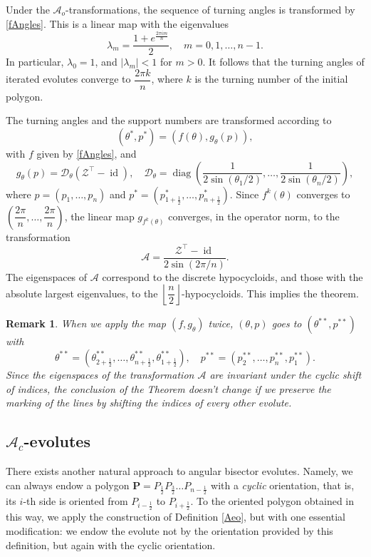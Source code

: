 \documentclass[12pt]{article}
\makeatletter
\newtheorem{remark}[lemma]{Remark}
\renewenvironment{proof}[1][\proofname] 
{\par\pushQED{\qed}\normalfont\topsep6\p@\@plus6\p@\relax\trivlist\item[\hskip\labelsep\bfseries#1\@addpunct{.}]\ignorespaces}{\popQED\endtrivlist\@endpefalse}
\newcommand{\Aev}{\mathcal{A}}
\newcommand{\Aec}{\mathcal{A}_c}
\newcommand{\Aeo}{\mathcal{A}_o}
\renewcommand{\P}{\mathbf{P}}
\newcommand{\id}{\operatorname{id}}
\newcommand{\diag}{\operatorname{diag}}
\makeatother
\begin{document}
\begin{proof}
Under the $\Aeo$-transformations, the sequence of turning angles is transformed by \eqref{fAngles}. This is a linear map with the eigenvalues
\[ \lambda_m = \frac{1+e^{\frac{2\pi i m}{n}}}2, \quad m = 0, 1, \ldots, n-1. \]
In particular, $\lambda_0 = 1$, and $|\lambda_m| < 1$ for $m > 0$. It follows that the turning angles of iterated evolutes converge to $\dfrac{2\pi k}{n}$, where $k$ is the turning number of the initial polygon. 
	
The turning angles and the support numbers are transformed according to
\[ (\theta^*, p^*) = (f(\theta), g_\theta(p)), \]
with $f$ given by \eqref{fAngles}, and
\[ g_\theta(p) = \mathcal{D}_\theta (\mathcal{Z}^\top - \id), \quad \mathcal{D}_\theta = \diag\left(\frac1{2\sin(\theta_1/2)}, \ldots, \frac1{2\sin(\theta_n/2)}\right), \]
where $p = (p_1, \ldots, p_n)$ and $p^* = (p^*_{1+\frac12}, \ldots, p^*_{n+\frac12})$. Since $f^k(\theta)$ converges to $\left( \dfrac{2\pi}n, \ldots, \dfrac{2\pi}n \right)$, the linear map $g_{f^k(\theta)}$ converges, in the operator norm, to the transformation
\[ \Aev = \frac{\mathcal{Z}^\top - \id}{2\sin(2\pi/n)}.\]
The eigenspaces of $\Aev$ correspond to the discrete hypocycloids, and those with the absolute largest eigenvalues, to the $\left\lfloor \dfrac{n}2\right\rfloor$-hypocycloids. This implies the theorem.
\end{proof}

\begin{remark}
{\rm 
When we apply the map $(f,g_\theta)$ twice,  $(\theta, p)$ goes to $(\theta^{**}, p^{**})$ with
\[ \theta^{**} = (\theta^{**}_{2+\frac12}, \ldots, \theta^{**}_{n+\frac12}, \theta^{**}_{1+\frac12}), \quad p^{**} = (p^{**}_2, \ldots, p^{**}_n, p^{**}_1). \]
Since the eigenspaces of the transformation $\Aev$ are invariant under the cyclic shift of indices, the conclusion of the Theorem doesn't change if we preserve the marking of the lines by shifting the indices of every other evolute.
}
\end{remark}
\subsection{$\Aec$-evolutes}\label{Ac-evo}

There exists another natural approach to angular bisector evolutes. Namely, we can always endow a polygon $\P=P_{\frac12}P_{\frac32}\dots P_{n-\frac12}$ with a {\it cyclic} orientation, that is, its $i$-th side is oriented from $P_{i-\frac12}$ to $P_{i+\frac12}$. To the oriented polygon obtained in this way, we apply the construction of Definition \ref{Aeo}, but with one essential modification: we endow the evolute not by the orientation provided by this definition, but again with the cyclic orientation. 
\end{document}
